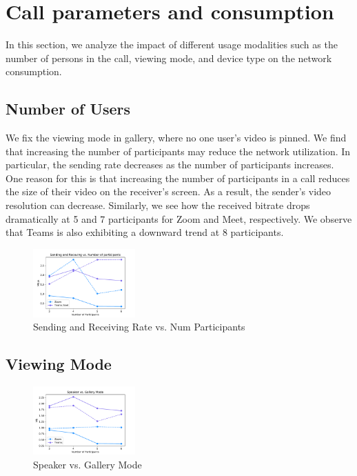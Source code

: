 \section{Call parameters and consumption}\label{sec:usage_modality}
In this section, we analyze the impact of different usage modalities such as the number of persons in the call, viewing mode, and device type on the network consumption. 
\subsection{Number of Users}
We fix the viewing mode in gallery, where no one user's video is pinned. We find that increasing the number of participants may reduce the network utilization. In particular, the sending rate decreases as the number of participants increases. One reason for this is that increasing the number of participants in a call reduces the size of their video on the receiver's screen. As a result, the sender's video resolution can decrease. Similarly, we see how the received bitrate drops dramatically at 5 and 7 participants for Zoom and Meet, respectively. We observe that Teams is also exhibiting a downward trend at 8 participants. 
\begin{figure}[]
    \includegraphics[width=0.35\textwidth,keepaspectratio]{../figures/modality/sending_call.pdf}
    \caption{Sending and Receiving Rate vs. Num Participants}
    \label{fig:loss_latency}
\end{figure}

\subsection{Viewing Mode}
\begin{figure}[]
    \includegraphics[width=0.35\textwidth,keepaspectratio]{../figures/modality/call_modality.pdf}
    \caption{Speaker vs. Gallery Mode}
    \label{fig:loss_latency}
\end{figure}